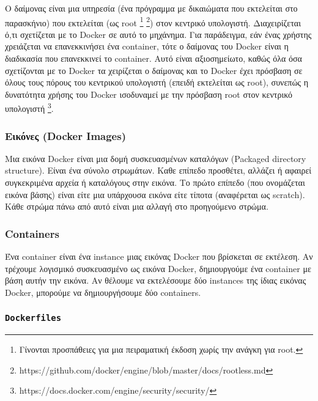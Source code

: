 Ο δαίμονας είναι μια υπηρεσία (ένα πρόγραμμα με δικαιώματα που εκτελείται στο
παρασκήνιο) που εκτελείται (ως \textlatin{root} 
\footnote{Γίνονται προσπάθειες για μια πειραματική έκδοση χωρίς την ανάγκη
για \textlatin{root}.}
\footnote{\textlatin{https://github.com/docker/engine/blob/master/docs/rootless.md}})
στον κεντρικό υπολογιστή. Διαχειρίζεται
ό,τι σχετίζεται με το \textlatin{Docker} σε αυτό το μηχάνημα.
Για παράδειγμα, εάν ένας χρήστης χρειάζεται να επανεκκινήσει ένα 
\textlatin{container}, τότε ο δαίμονας του \textlatin{Docker} είναι η διαδικασία
που επανεκκινεί το \textlatin{container}. Αυτό είναι αξιοσημείωτο, καθώς
όλα όσα σχετίζονται με το \textlatin{Docker} τα χειρίζεται ο δαίμονας και
το \textlatin{Docker} έχει πρόσβαση σε όλους τους πόρους του κεντρικού
υπολογιστή (επειδή εκτελείται ως \textlatin{root}), συνεπώς η δυνατότητα χρήσης
του \textlatin{Docker} ισοδυναμεί με την πρόσβαση \textlatin{root} στον κεντρικό
υπολογιστή
\footnote{\textlatin{https://docs.docker.com/engine/security/security/}}.

\subsubsection{Εικόνες (\textlatin{Docker Images})}

Μια εικόνα \textlatin{Docker} είναι μια δομή συσκευασμένων καταλόγων 
(\textlatin{Packaged directory structure}). Είναι
ένα σύνολο στρωμάτων. Καθε επίπεδο προσθέτει, αλλάζει ή αφαιρεί συγκεκριμένα
αρχεία ή καταλόγους στην εικόνα. Το πρώτο επίπεδο (που ονομάζεται εικόνα βάσης)
είναι είτε μια υπάρχουσα εικόνα είτε τίποτα (αναφέρεται ως \textlatin{scratch}).
Κάθε στρώμα πάνω από αυτό είναι μια αλλαγή στο προηγούμενο στρώμα.

\subsubsection{\textlatin{Containers}}

Ένα \textlatin{container} είναι ένα \textlatin{instance} μιας εικόνας
\textlatin{Docker} που βρίσκεται σε εκτέλεση. Αν τρέχουμε λογισμικό
συσκευασμένο ως εικόνα \textlatin{Docker}, δημιουργούμε ένα
\textlatin{container} με βάση αυτήν την εικόνα. Αν θέλουμε να εκτελέσουμε
δύο \textlatin{instances} της ίδιας εικόνας \textlatin{Docker}, μπορούμε να
δημιουργήσουμε δύο \textlatin{containers}.

\subsubsection{\texttt{\textlatin{Dockerfiles}}}

